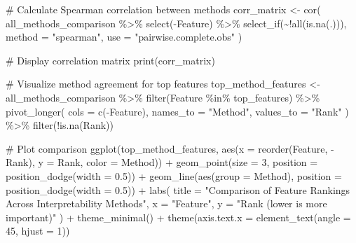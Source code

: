 \documentclass[
  letterpaper,
  DIV=11,
  numbers=noendperiod]{scrreprt}
\newenvironment{Shaded}{\begin{snugshade}}{\end{snugshade}}
\newcommand{\AttributeTok}[1]{\textcolor[rgb]{0.40,0.45,0.13}{#1}}
\newcommand{\CommentTok}[1]{\textcolor[rgb]{0.37,0.37,0.37}{#1}}
\newcommand{\DecValTok}[1]{\textcolor[rgb]{0.68,0.00,0.00}{#1}}
\newcommand{\FloatTok}[1]{\textcolor[rgb]{0.68,0.00,0.00}{#1}}
\newcommand{\FunctionTok}[1]{\textcolor[rgb]{0.28,0.35,0.67}{#1}}
\newcommand{\NormalTok}[1]{\textcolor[rgb]{0.00,0.23,0.31}{#1}}
\newcommand{\OtherTok}[1]{\textcolor[rgb]{0.00,0.23,0.31}{#1}}
\newcommand{\SpecialCharTok}[1]{\textcolor[rgb]{0.37,0.37,0.37}{#1}}
\newcommand{\StringTok}[1]{\textcolor[rgb]{0.13,0.47,0.30}{#1}}
\begin{document}
\begin{Shaded}
\begin{Highlighting}[]
\CommentTok{\# Calculate Spearman correlation between methods}
\NormalTok{corr\_matrix }\OtherTok{\textless{}{-}} \FunctionTok{cor}\NormalTok{(}
\NormalTok{  all\_methods\_comparison }\SpecialCharTok{\%\textgreater{}\%} 
    \FunctionTok{select}\NormalTok{(}\SpecialCharTok{{-}}\NormalTok{Feature) }\SpecialCharTok{\%\textgreater{}\%} 
    \FunctionTok{select\_if}\NormalTok{(}\SpecialCharTok{\textasciitilde{}!}\FunctionTok{all}\NormalTok{(}\FunctionTok{is.na}\NormalTok{(.))), }
  \AttributeTok{method =} \StringTok{"spearman"}\NormalTok{,}
  \AttributeTok{use =} \StringTok{"pairwise.complete.obs"}
\NormalTok{)}

\CommentTok{\# Display correlation matrix}
\FunctionTok{print}\NormalTok{(corr\_matrix)}

\CommentTok{\# Visualize method agreement for top features}
\NormalTok{top\_method\_features }\OtherTok{\textless{}{-}}\NormalTok{ all\_methods\_comparison }\SpecialCharTok{\%\textgreater{}\%}
  \FunctionTok{filter}\NormalTok{(Feature }\SpecialCharTok{\%in\%}\NormalTok{ top\_features) }\SpecialCharTok{\%\textgreater{}\%}
  \FunctionTok{pivot\_longer}\NormalTok{(}
    \AttributeTok{cols =} \FunctionTok{c}\NormalTok{(}\SpecialCharTok{{-}}\NormalTok{Feature),}
    \AttributeTok{names\_to =} \StringTok{"Method"}\NormalTok{,}
    \AttributeTok{values\_to =} \StringTok{"Rank"}
\NormalTok{  ) }\SpecialCharTok{\%\textgreater{}\%}
  \FunctionTok{filter}\NormalTok{(}\SpecialCharTok{!}\FunctionTok{is.na}\NormalTok{(Rank))}

\CommentTok{\# Plot comparison}
\FunctionTok{ggplot}\NormalTok{(top\_method\_features, }\FunctionTok{aes}\NormalTok{(}\AttributeTok{x =} \FunctionTok{reorder}\NormalTok{(Feature, }\SpecialCharTok{{-}}\NormalTok{Rank), }\AttributeTok{y =}\NormalTok{ Rank, }\AttributeTok{color =}\NormalTok{ Method)) }\SpecialCharTok{+}
  \FunctionTok{geom\_point}\NormalTok{(}\AttributeTok{size =} \DecValTok{3}\NormalTok{, }\AttributeTok{position =} \FunctionTok{position\_dodge}\NormalTok{(}\AttributeTok{width =} \FloatTok{0.5}\NormalTok{)) }\SpecialCharTok{+}
  \FunctionTok{geom\_line}\NormalTok{(}\FunctionTok{aes}\NormalTok{(}\AttributeTok{group =}\NormalTok{ Method), }\AttributeTok{position =} \FunctionTok{position\_dodge}\NormalTok{(}\AttributeTok{width =} \FloatTok{0.5}\NormalTok{)) }\SpecialCharTok{+}
  \FunctionTok{labs}\NormalTok{(}
    \AttributeTok{title =} \StringTok{"Comparison of Feature Rankings Across Interpretability Methods"}\NormalTok{,}
    \AttributeTok{x =} \StringTok{"Feature"}\NormalTok{,}
    \AttributeTok{y =} \StringTok{"Rank (lower is more important)"}
\NormalTok{  ) }\SpecialCharTok{+}
  \FunctionTok{theme\_minimal}\NormalTok{() }\SpecialCharTok{+}
  \FunctionTok{theme}\NormalTok{(}\AttributeTok{axis.text.x =} \FunctionTok{element\_text}\NormalTok{(}\AttributeTok{angle =} \DecValTok{45}\NormalTok{, }\AttributeTok{hjust =} \DecValTok{1}\NormalTok{))}
\end{Highlighting}
\end{Shaded}
\end{document}
